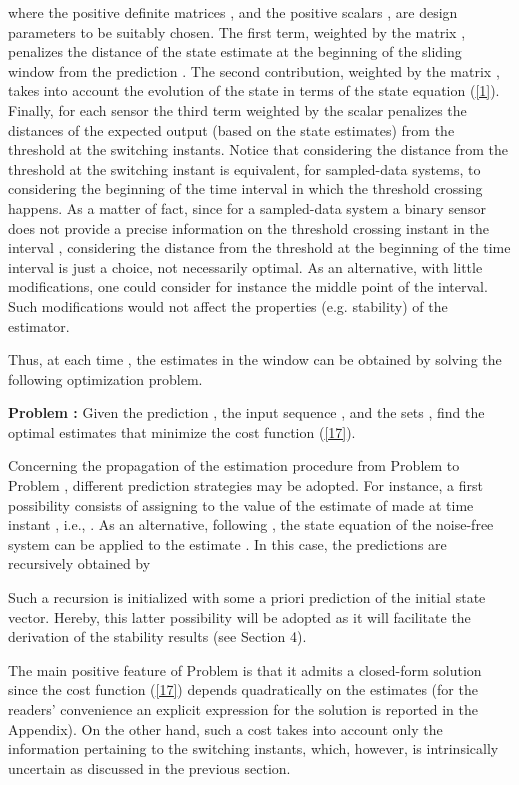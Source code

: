 \documentclass[11pt,journal,onecolumn]{IEEEtran}
\begin{document}
where the positive definite matrices ,  and the positive scalars , are design parameters to be suitably chosen. The first term, weighted by the matrix , penalizes the distance of the state estimate at the beginning of the sliding window from the prediction . The second contribution, weighted by the matrix , takes into account the evolution of the state in terms of the state equation (\ref{1}). Finally, for each sensor  the third term weighted by the scalar  penalizes the distances of the expected output (based on the state estimates)  from the threshold  at the switching instants.
Notice that considering the distance from the threshold at the switching instant is equivalent, for sampled-data systems, to considering the beginning of the time interval  in which the threshold crossing happens. As a matter of fact, since for a sampled-data system a binary sensor does not provide a precise information on the threshold crossing instant in
the interval , considering the distance from the threshold at the beginning of the time interval is just a choice, not necessarily optimal. As an alternative, with little modifications, one could consider for instance the middle point of the interval. Such modifications would not affect the properties (e.g. stability) of the estimator.

Thus, at each time , the estimates in the window  can be obtained by solving the following optimization problem. \vspace{.3cm}

\textbf{Problem :} Given the prediction , the input sequence , and the sets ,  find the optimal estimates  that minimize the cost function (\ref{17}). \vspace{.3cm}

Concerning the propagation of the estimation procedure from Problem  to Problem , different prediction strategies may be adopted.
For instance, a first possibility consists of assigning to  the value of the estimate of  made at time instant , i.e., . As an alternative, following \cite{NLMHE}, the state equation of the noise-free system can be applied to the estimate . In this case, the predictions are recursively obtained by

Such a recursion is initialized with some a priori prediction  of the initial state vector. Hereby, this latter possibility will be adopted as it will facilitate the derivation of the stability results (see Section 4).

The main positive feature of Problem  is that it admits a closed-form solution since the cost function (\ref{17}) depends quadratically on the estimates  (for the readers' convenience an explicit expression for the solution is reported in the Appendix). On the other hand, such a cost takes into account only the information pertaining to the switching instants, which, however, is intrinsically uncertain as discussed in the previous section.
\end{document}
